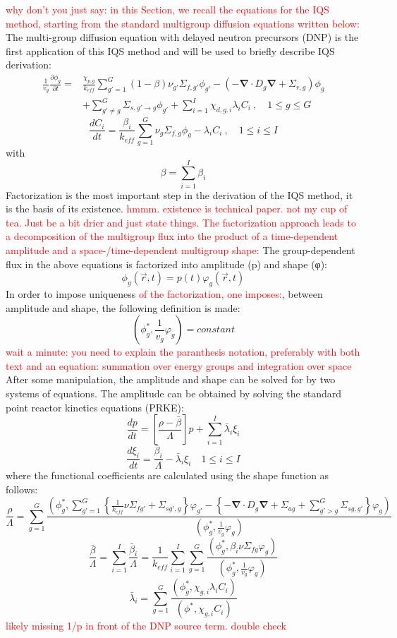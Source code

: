 \documentclass[11pt]{scrartcl}
\renewcommand{\div}{\bs{\nabla}\! \cdot \!}
\newcommand{\grad}{\bs{\nabla}}
\newcommand{\bs}[1]{\mathbf{#1}}
\newcommand{\keff}{k_\textit{eff}}
\newcommand{\be}{\begin{equation}}
\newcommand{\ee}{\end{equation}}
\newcommand{\tcr}[1]{\textcolor{red}{#1}}
\begin{document}
\tcr{why don't you just say: in this Section, we recall the equations for the IQS method, starting
from the standard multigroup diffusion equations written below:\\}
The multi-group diffusion equation with delayed neutron precursors (DNP) is the first application of this IQS method and will be used to briefly describe IQS derivation:
\begin{align}
\frac{1}{v_g} \frac{\partial \phi_g }{\partial t} =& 
\frac{\chi_{p,g}}{\keff} \sum_{g'=1}^G (1-\beta) \nu_{g'} \Sigma_{f,g'} \phi_{g'} 
-  \left( -\div D_g \grad  + \Sigma_{r,g} \right) \phi_g  \nonumber \\
&  + \sum_{g'\neq g}^G\Sigma_{s,g'\to g} \phi_{g'}  + \sum_{i=1}^I\chi_{d,g,i}\lambda_i C_i \ , \quad 1 \le g \le G 
\end{align}
\be
\frac{dC_i}{dt} = \frac{\beta_i}{k_{eff}}\sum_{g=1}^G\nu_{g} \Sigma_{f,g} \phi_{g} - \lambda_i C_i \ , \quad 1 \le i \le I 
\ee
with
\be
\beta = \sum_{i=1}^I \beta_{i} 
\ee
Factorization is the most important step in the derivation of the IQS method, it is the basis of its existence.  
\tcr{hmmm. existence is technical paper. not my cup of tea. Just be a bit drier and just state things. 
The factorization approach leads to a decomposition of the multigroup flux into the product of a time-dependent amplitude and a space-/time-dependent multigroup shape:}
The group-dependent flux in the above equations is factorized into amplitude (p) and shape (φ):
\be
\phi_g(\vec{r},t)=p(t)\varphi_g(\vec{r},t)
\ee
In order to impose uniqueness \tcr{of the factorization, one imposes:}, between amplitude and shape, the following definition is made:
\be
\left(\phi_g^*,\frac{1}{v_g}\varphi_g\right)=constant
\ee
\tcr{wait a minute: you need to explain the paranthesis notation, preferably with both text and an equation:
summation over energy groups and integration over space\\}
After some manipulation, the amplitude and shape can be solved for by two systems of equations.  The amplitude can be obtained by solving the standard point reactor kinetics equations (PRKE):
\be
\frac{dp}{dt}=\left[\frac{\rho-\bar{\beta}}{\Lambda}\right]p+\sum_{i=1}^I\bar{\lambda}_i\xi_i
\ee
\be
\frac{d\xi_i}{dt}=\frac{\bar{\beta}_i}{\Lambda}-\bar{\lambda}_i\xi_i \quad 1 \le i \le I 
\ee
where the functional coefficients are calculated using the shape function as follows:
\be
\frac{\rho}{\Lambda}=\sum_{g=1}^G\frac{ \left(\phi_g^*,\sum_{g'=1}^G\left\{\frac{1}{k_{eff}} \nu \Sigma_{fg'}+\Sigma_{sg',g}\right\}\varphi_{g'} -\left\{ -\div D_g \grad+\Sigma_{ag}+\sum_{g'>g}^G\Sigma_{sg,g'}\right\}\varphi_g\right)}{\left(\phi_g^*,\frac{1}{v_g}\varphi_g\right)}
\ee
\be
\frac{\bar{\beta}}{\Lambda}=\sum_{i=1}^I\frac{\bar{\beta}_i}{\Lambda}=\frac{1}{k_{eff}}\sum_{i=1}^I\sum_{g=1}^G\frac{(\phi_g^*,\beta_i\nu\Sigma_{fg}\varphi_g)}{\left(\phi_g^*,\frac{1}{v_g}\varphi_g\right)}
\ee
\be
\bar{\lambda}_i=\sum_{g=1}^G\frac{(\phi_g^*,\chi_{g,i}\lambda_iC_i)}{(\phi^*,\chi_{g,i}C_i)}
\ee
\tcr{likely missing 1/p in front of the DNP source term. double check}
\end{document}

